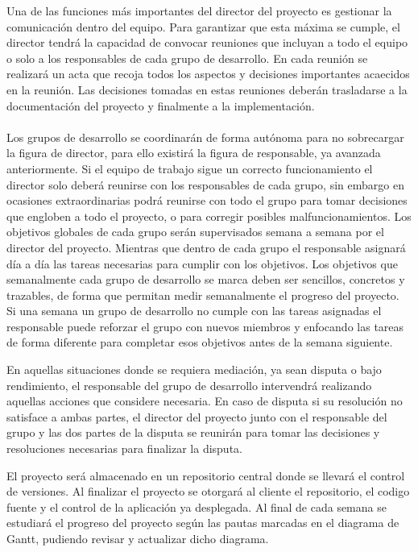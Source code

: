 Una de las funciones más importantes del director del proyecto es gestionar la comunicación dentro del equipo. Para garantizar que esta máxima se cumple, el director tendrá la capacidad de convocar reuniones que incluyan a todo el equipo o solo a los responsables de cada grupo de desarrollo. En cada reunión se realizará un acta que recoja todos los aspectos y decisiones importantes acaecidos en la reunión. Las decisiones tomadas en estas reuniones deberán trasladarse a la documentación del proyecto y finalmente a la implementación.
\\\\
Los grupos de desarrollo se coordinarán de forma autónoma para no sobrecargar la figura de director, para ello existirá la figura de responsable, ya avanzada anteriormente. Si el equipo de trabajo sigue un correcto funcionamiento el director solo deberá reunirse con los responsables de cada grupo, sin embargo en ocasiones extraordinarias podrá reunirse con todo el grupo para tomar decisiones que engloben a todo el proyecto, o para corregir posibles malfuncionamientos. Los objetivos globales de cada grupo serán supervisados semana a semana por el director del proyecto. Mientras que dentro de cada grupo el responsable asignará día a día las tareas necesarias para cumplir con los objetivos. Los objetivos que semanalmente cada grupo de desarrollo se marca deben ser sencillos, concretos y trazables, de forma que permitan  medir semanalmente el progreso del proyecto. Si una semana un grupo de desarrollo no cumple con las tareas asignadas el responsable puede reforzar el grupo con nuevos miembros y enfocando las tareas de forma diferente para completar esos objetivos antes de la semana siguiente.

En aquellas situaciones donde se requiera mediación, ya sean disputa o bajo rendimiento, el responsable del grupo de desarrollo intervendrá realizando aquellas acciones que considere necesaria. En caso de disputa si su resolución no satisface a ambas partes, el director del proyecto junto con el responsable del grupo y las dos partes de la disputa se reunirán para tomar las decisiones y resoluciones necesarias para finalizar la disputa.

El proyecto será almacenado en un repositorio central donde se llevará el control de versiones. Al finalizar el proyecto se otorgará al cliente el repositorio, el codigo fuente y el control de la aplicación ya desplegada. Al final de cada semana se estudiará el progreso del proyecto según las pautas marcadas en el diagrama de Gantt, pudiendo revisar y actualizar dicho diagrama.

